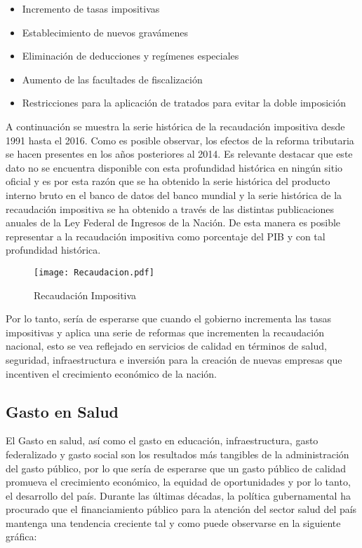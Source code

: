 \begin{itemize}
\item Incremento de tasas impositivas
\item Establecimiento de nuevos gravámenes
\item Eliminación de deducciones y regímenes especiales
\item Aumento de las facultades de fiscalización
\item Restricciones para la aplicación de tratados para evitar la doble imposición
\end{itemize}

A continuación se muestra la serie histórica de la recaudación impositiva desde 1991 hasta el 2016. Como es posible observar, los efectos de la reforma tributaria se hacen presentes en los años posteriores al 2014. Es relevante destacar que este dato no se encuentra disponible con esta profundidad histórica en ningún sitio oficial y es por esta razón que se ha obtenido la serie histórica del producto interno bruto en el banco de datos del banco mundial y la serie histórica de la recaudación impositiva se ha obtenido a través de las distintas publicaciones anuales de la Ley Federal de Ingresos de la Nación. De esta manera es posible representar a la recaudación impositiva como porcentaje del PIB y con tal profundidad histórica.

\begin{figure}[H]
\centering
\texttt{[image: Recaudacion.pdf]}
\caption{Recaudación Impositiva}
\label{Rec}
\end{figure}

Por lo tanto, sería de esperarse que cuando el gobierno incrementa las tasas impositivas y aplica una serie de reformas que incrementen la recaudación nacional, esto se vea reflejado en servicios de calidad en términos de salud, seguridad, infraestructura e inversión para la creación de nuevas empresas que incentiven el crecimiento económico de la nación.

\subsection{Gasto en Salud}


El Gasto en salud, así como el gasto en educación, infraestructura, gasto federalizado y gasto social son los resultados más tangibles de la administración del gasto público, por lo que sería de esperarse que un gasto público de calidad promueva el crecimiento económico, la equidad de oportunidades y por lo tanto, el desarrollo del país. Durante las últimas décadas, la política gubernamental ha procurado que el financiamiento público para la atención del sector salud del país mantenga una tendencia creciente tal y como puede observarse en la siguiente gráfica:

